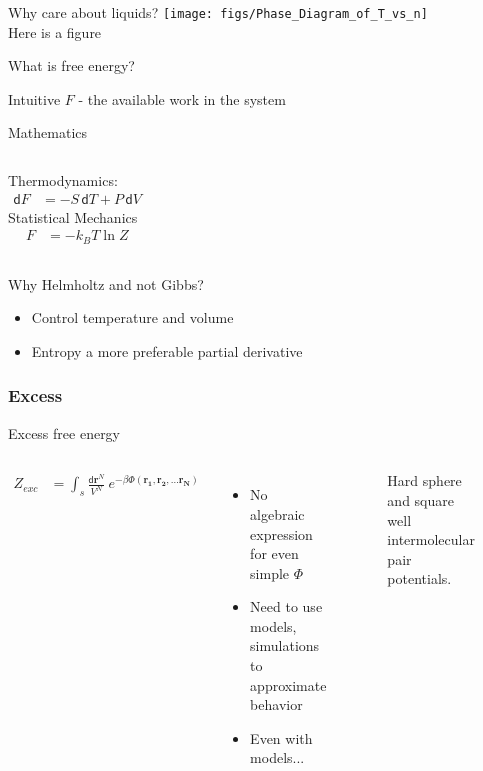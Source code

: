 \documentclass{beamer}
\newcommand*{\diff}{\mathsf{d}}
\begin{document}
\begin{frame}{Why care about liquids?}
    \centering
    \texttt{[image: figs/Phase\_Diagram\_of\_T\_vs\_n]}\\
    \vspace{-1em}
    Here is a figure
\end{frame}

\begin{frame}{What is free energy?}
	\begin{block}{Intuitive}
			$F$ - the available work in the system
	\end{block}
    \begin{block}{Mathematics}
		\vspace{1em}
		\begin{columns}[t]
		{\centering Thermodynamics:
		\begin{align*}
			\diff F &= - S\,  \diff T + P\, \diff V
		\end{align*}}
		{\centering
		Statistical Mechanics
		\begin{align*}
		F &= - k_B T \ln Z
		\end{align*}}
		\end{columns}
    \end{block}		
		Why Helmholtz and not Gibbs?
	\begin{itemize}
		\item Control temperature and volume 
		\item Entropy a more preferable partial derivative
	\end{itemize}
\end{frame}

\subsubsection*{Excess}
\begin{frame}{Excess free energy}	
	\begin{columns}[t]
	\setlength\abovedisplayskip{-2pt} 
	\begin{align*}
		Z_{exc} &= \int_s \frac{\diff\mathbf{r}^N}{V^N} ~e^{-\beta \Phi(\mathbf{r_1}, \mathbf{r_2}, \dots \mathbf{r_N})}
	\end{align*}
	\begin{itemize}
		\item No algebraic expression for even simple $\Phi$
		\item Need to use models, simulations to approximate behavior
		\item Even with models...
	\end{itemize}
	\begin{figure}
		\caption{Hard sphere and square well intermolecular pair potentials.}
	\end{figure}
	\end{columns}
\end{frame}
\end{document}
